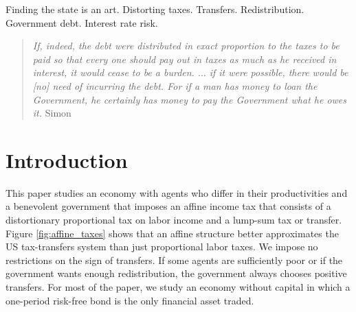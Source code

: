 \documentclass[thmsb,11pt]{article}
\begin{document}
\bigskip
{} Finding the state is an art.  Distorting taxes. Transfers. Redistribution.  Government debt.  Interest rate risk.
\thispagestyle{empty}\bigskip

\bigskip \newpage

\setcounter{page}{1}

\bigskip \baselineskip0.65cm


%




\begin{quote}
\emph{If, indeed, the debt were distributed in exact proportion to the taxes
to be paid so that every one should pay out in taxes as much as he received
in interest, it would cease to be a burden.%
$\ldots$ if it were possible, there
would be [no] need of incurring the debt. For if a man has money to loan the
Government, he certainly has money to pay the Government what he owes it.
}Simon \citet[p.85]{newcomb1865critical}
\end{quote}




\section{Introduction}
%

This paper studies  an economy with  agents who differ in
their productivities and a  benevolent government that imposes an affine income tax that consists of a distortionary proportional
tax on labor income and a lump-sum tax or transfer. Figure \ref{fig:affine_taxes} shows that an affine structure better approximates the US tax-transfers system than just proportional labor taxes.  We
impose no restrictions on the sign of transfers. If some agents are
sufficiently poor or if the government wants enough redistribution, the
government  always chooses positive transfers.
For most of the paper, we  study an economy without capital in
which  a one-period risk-free bond is the only financial asset traded.
\end{document}
